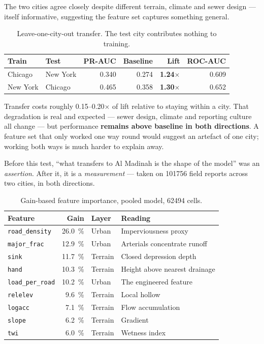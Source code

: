 \documentclass[11pt,a4paper]{article}
\newcommand{\ttt}[1]{\texttt{#1}}
\begin{document}
The two cities agree closely despite different terrain, climate and sewer design ---
itself informative, suggesting the feature set captures something general.

\begin{table}[htbp]\centering\small
\caption{Leave-one-city-out transfer. The test city contributes nothing to training.}
\label{tab:transfer}
\begin{tabular}{@{}llrrrr@{}}
\toprule
Train & Test & PR-AUC & Baseline & Lift & ROC-AUC\\
\midrule
\rowcolor{rowtint}
Chicago & New York & 0.340 & 0.274 & \textbf{1.24$\times$} & 0.609\\
\rowcolor{rowtint}
New York & Chicago & 0.465 & 0.358 & \textbf{1.30$\times$} & 0.652\\
\bottomrule
\end{tabular}
\end{table}

Transfer costs roughly \num{0.15}--\num{0.20}$\times$ of lift relative to staying within a
city. That degradation is real and expected --- sewer design, climate and reporting
culture all change --- but performance \textbf{remains above baseline in both directions}.
A feature set that only worked one way round would suggest an artefact of one city;
working both ways is much harder to explain away.

\begin{keybox}
Before this test, ``what transfers to Al Madinah is the shape of the model'' was an
\emph{assertion}. After it, it is a \emph{measurement} --- taken on \num{101756} field
reports across two cities, in both directions.
\end{keybox}

\begin{table}[htbp]\centering\small
\caption{Gain-based feature importance, pooled model, \num{62494} cells.}\label{tab:importance}
\begin{tabular}{@{}lrll@{}}
\toprule
Feature & Gain & Layer & Reading\\
\midrule
\rowcolor{rowtint}
\ttt{road\_density} & \SI{26.0}{\percent} & Urban & Imperviousness proxy\\
\rowcolor{rowtint}
\ttt{major\_frac} & \SI{12.9}{\percent} & Urban & Arterials concentrate runoff\\
\ttt{sink} & \SI{11.7}{\percent} & Terrain & Closed depression depth\\
\ttt{hand} & \SI{10.3}{\percent} & Terrain & Height above nearest drainage\\
\rowcolor{rowtint}
\ttt{load\_per\_road} & \SI{10.2}{\percent} & Urban & The engineered feature\\
\ttt{relelev} & \SI{9.6}{\percent} & Terrain & Local hollow\\
\ttt{logacc} & \SI{7.1}{\percent} & Terrain & Flow accumulation\\
\ttt{slope} & \SI{6.2}{\percent} & Terrain & Gradient\\
\ttt{twi} & \SI{6.0}{\percent} & Terrain & Wetness index\\
\bottomrule
\end{tabular}
\end{table}
\end{document}
